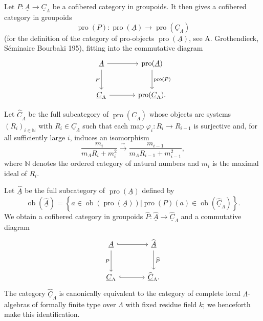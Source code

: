 
Let $P:\underline A\longrightarrow\underline C_\Lambda$ be a
cofibered category in groupoids. It then gives a cofibered category in
groupoids
\[
 \operatorname{pro}(P):\operatorname{pro}(\underline A)
 \longrightarrow\operatorname{pro}(\underline C_\Lambda)
\]
(for the definition of the category of pro-objects
$\operatorname{pro}(\underline A)$, see A. Grothendieck,
S\'eminaire Bourbaki 195), fitting into the commutative diagram
\[
\begin{tikzcd}[column sep=large,row sep=large]
\underline A \arrow[r] \arrow[d,"P"']
 & \operatorname{pro}(\underline A)
   \arrow[d,"\operatorname{pro}(P)"] \\
\underline C_\Lambda \arrow[r]
 & \operatorname{pro}(\underline C_\Lambda).
\end{tikzcd}
\]

Let $\widehat{\underline C}_\Lambda$ be the full subcategory of
$\operatorname{pro}(\underline C_\Lambda)$ whose objects are systems
$(R_i)_{i\in\mathbb N}$ with $R_i\in\underline C_\Lambda$ such that
each map $\varphi_i:R_i\longrightarrow R_{i-1}$ is surjective and,
for all sufficiently large $i$, induces an isomorphism
\[
 \frac{m_i}{m_\Lambda R_i+m_i^2}
 \xrightarrow{\ \sim\ }
 \frac{m_{i-1}}{m_\Lambda R_{i-1}+m_{i-1}^2},
\]
where $\mathbb N$ denotes the ordered category of natural numbers and
$m_i$ is the maximal ideal of $R_i$.

Let $\widehat{\underline A}$ be the full subcategory of
$\operatorname{pro}(\underline A)$ defined by
\[
 \operatorname{ob}(\widehat{\underline A})=
 \left\{a\in\operatorname{ob}(\operatorname{pro}(\underline A))
 \mathrel{\Big|}
 \operatorname{pro}(P)(a)\in
 \operatorname{ob}(\widehat{\underline C}_\Lambda)\right\}.
\]
We obtain a cofibered category in groupoids
$\widehat P:\widehat{\underline A}\longrightarrow
\widehat{\underline C}_\Lambda$ and a commutative diagram
\[
\begin{tikzcd}[column sep=large,row sep=large]
\underline A \arrow[r,hook] \arrow[d,"P"']
 & \widehat{\underline A} \arrow[d,"\widehat P"] \\
\underline C_\Lambda \arrow[r,hook]
 & \widehat{\underline C}_\Lambda.
\end{tikzcd}
\]
The category $\widehat{\underline C}_\Lambda$ is canonically
equivalent to the category of complete local $\Lambda$-algebras of
formally finite type over $\Lambda$ with fixed residue field $k$; we
henceforth make this identification.

